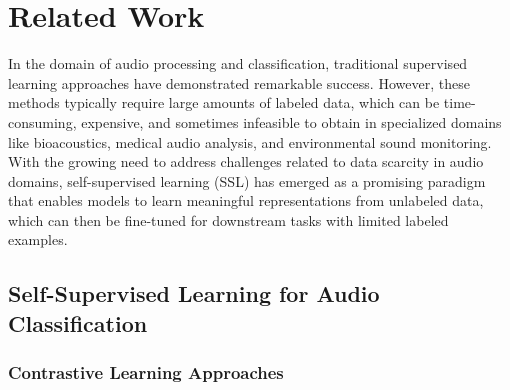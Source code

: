 \documentclass[11pt]{article}
\begin{document}
\section{Related Work}

In the domain of audio processing and classification, traditional supervised learning approaches have demonstrated remarkable success. However, these methods typically require large amounts of labeled data, which can be time-consuming, expensive, and sometimes infeasible to obtain in specialized domains like bioacoustics, medical audio analysis, and environmental sound monitoring. With the growing need to address challenges related to data scarcity in audio domains, self-supervised learning (SSL) has emerged as a promising paradigm that enables models to learn meaningful representations from unlabeled data, which can then be fine-tuned for downstream tasks with limited labeled examples.

\subsection{Self-Supervised Learning for Audio Classification}

\subsubsection{Contrastive Learning Approaches}
\end{document}
